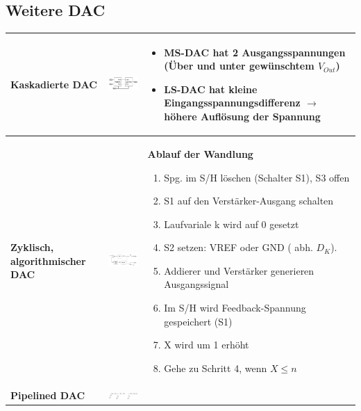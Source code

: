 \subsection{Weitere DAC}
\begin{longtable}{|>{\bfseries}p{4cm}|c|p{8cm}|}
	\hline
	Kaskadierte DAC
	& \includegraphics[width=5cm, valign=t]{./images/kaskadiertDAC.png}
	& \begin{itemize}
  		\item MS-DAC hat 2 Ausgangsspannungen (Über und unter gewünschtem
  			$V_{Out}$)
  		\item LS-DAC hat kleine Eingangsspannungsdifferenz $\to$ höhere Auflösung der Spannung
	  \end{itemize}
	\\ \hline
	Zyklisch, algorithmischer DAC \hartl{466}
	& \includegraphics[width=6cm, valign=t]{./images/zyklischDAC.png}
	& \textbf{Ablauf der Wandlung}
	  \begin{enumerate}
  		\item Spg. im S/H löschen (Schalter S1), S3 offen
  		\item S1 auf den Verstärker-Ausgang schalten
  		\item Laufvariale k wird auf 0 gesetzt
  		\item S2 setzen: VREF oder GND ( abh. $D_{K}$).
  		\item Addierer und Verstärker generieren Ausgangssignal
  		\item Im S/H wird Feedback-Spannung gespeichert (S1)
  		\item X wird um 1 erhöht
  		\item Gehe zu Schritt 4, wenn $X\leq n$
	  \end{enumerate}
	\\ \hline
	Pipelined DAC 
	& \includegraphics[width=6cm, valign=t]{images/pipelinedDAC}

\end{longtable}
